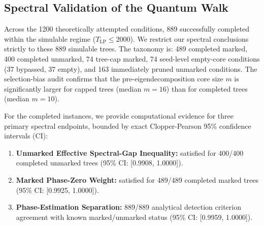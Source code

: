 \documentclass[conference]{IEEEtran}
\begin{document}
\begin{table}[htbp]
\caption{Average Core Ratio $\alpha = m/n$ by Instance Type}
\label{tab:fixing}
\begin{center}
\end{center}
\end{table}

\subsection{Spectral Validation of the Quantum Walk}
Across the 1200 theoretically attempted conditions, 889 successfully completed within the simulable regime ($T_{\text{LP}} \le 2000$). We restrict our spectral conclusions strictly to these 889 simulable trees. The taxonomy is: 489 completed marked, 400 completed unmarked, 74 tree-cap marked, 74 seed-level empty-core conditions (37 bypassed, 37 empty), and 163 immediately pruned unmarked conditions. The selection-bias audit confirms that the pre-eigendecomposition core size $m$ is significantly larger for capped trees (median $m=16$) than for completed trees (median $m=10$).

For the completed instances, we provide computational evidence for three primary spectral endpoints, bounded by exact Clopper-Pearson 95\% confidence intervals (CI):
\begin{enumerate}
    \item \textbf{Unmarked Effective Spectral-Gap Inequality:} satisfied for 400/400 completed unmarked trees (95\% CI: [0.9908, 1.0000]).
    \item \textbf{Marked Phase-Zero Weight:} satisfied for 489/489 completed marked trees (95\% CI: [0.9925, 1.0000]).
    \item \textbf{Phase-Estimation Separation:} 889/889 analytical detection criterion agreement with known marked/unmarked status (95\% CI: [0.9959, 1.0000]).
\end{enumerate}
\end{document}
